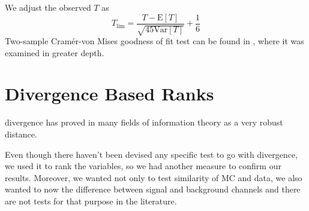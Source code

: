 We adjust the observed $T$ as
\begin{equation}
T_\mathrm{lim} = \frac{T-\mathrm{E}[T]}{\sqrt{45\mathrm{Var}[T]}} + \frac{1}{6}
\end{equation}
Two-sample Cram\'er-von Mises goodness of fit test can be found in \cite{Anderson62}, where it was examined in greater depth.

\section{\ren Divergence Based Ranks}
\ren divergence has proved in many fields of information theory as a very robust distance. 

Even though there haven't been devised any specific test to go with \ren divergence, we used it to rank the variables, so we had another measure to confirm our results. Moreover, we wanted not only to test similarity of MC and data, we also wanted to now the difference between signal and background channels and there are not tests for that purpose in the literature.


